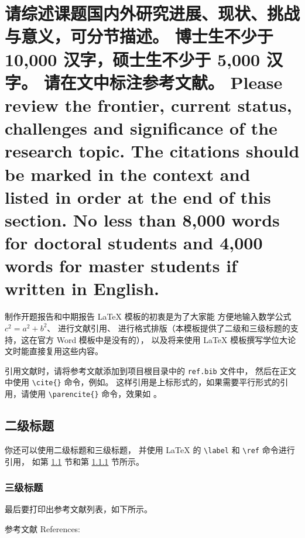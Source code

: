 \documentclass[a4paper,zihao=-4,AutoFakeBold]{ctexart}
\begin{document}
\makecover

\makeinstruction

\makeprojectinfo

\initbodyformat


\vspace{-\parskip}
\section{请综述课题国内外研究进展、现状、挑战与意义，可分节描述。
  博士生不少于 10,000 汉字，硕士生不少于 5,000 汉字。
  请在文中标注参考文献。
  Please review the frontier, current status,
  challenges and significance of the research topic.
  The citations should be marked in the context
  and listed in order at the end of this section.
  No less than 8,000 words for doctoral students
  and 4,000 words for master students if written in English.}


制作开题报告和中期报告 \LaTeX{} 模板的初衷是为了大家能
方便地输入数学公式 $c^2 = a^2 + b^2$、
进行文献引用\cite{ZJSD}、
进行格式排版（本模板提供了二级和三级标题的支持，这在官方 Word 模板中是没有的），
以及将来使用 \LaTeX{} 模板撰写学位大论文时能直接复用这些内容。


引用文献时，请将参考文献添加到项目根目录中的 \texttt{ref.bib} 文件中，
然后在正文中使用 \verb|\cite{}| 命令，例如\cite{SPDZ}。
这样引用是上标形式的，如果需要平行形式的引用，请使用
\verb|\parencite{}| 命令，效果如 \parencite{SPDZ}。


\subsection{二级标题}\label{sub}

你还可以使用二级标题和三级标题，
并使用 \LaTeX{} 的 \verb|\label| 和 \verb|\ref| 命令进行引用，
如第 \ref{sub} 节和第 \ref{subsub} 节所示。



\subsubsection{三级标题}\label{subsub}

最后要打印出参考文献列表，如下所示。


\vspace{2\baselineskip}%
{%
  \linespread{1.25}\selectfont    %
  参考文献 References:\par
  \vspace{-1em}
  \printbibliography[heading=none]
}
\end{document}
